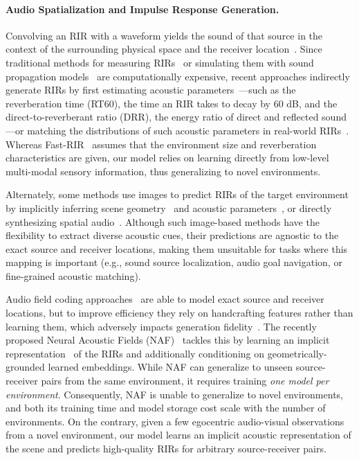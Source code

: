 \paragraph{Audio Spatialization and Impulse Response Generation.} Convolving an RIR with a waveform yields the sound of that source in the context of the surrounding physical space and the receiver location~\citep{10.1109/TASL.2013.2256897, 10.1145/2980179.2982431, Funkhouser03abeam, Savioja2015OverviewOG}. Since traditional methods for measuring RIRs~\citep{Holters2009IMPULSERM, stan2002comparison} or simulating them with sound propagation models~\citep{imageMethod79, chen2020soundspaces, 4117929} are computationally expensive, recent approaches indirectly generate RIRs by first estimating acoustic parameters~\citep{ratnarajah2022fast, 7486010, 8521241, Klein_Neidhardt_Seipel_2019, DBLP:conf/interspeech/MackDH20, 8506462}---such as the reverberation time (RT60), the time an RIR takes to decay by 60 dB, and the direct-to-reverberant ratio (DRR), the energy ratio of direct and reflected sound---or matching the distributions of such acoustic parameters in real-world RIRs~\citep{ratnarajah2020ir}.  Whereas Fast-RIR~\citep{ratnarajah2022fast} assumes that the environment size and reverberation characteristics are given, our model relies on learning directly from low-level multi-modal sensory information, thus generalizing to novel environments.

Alternately, some methods use images to predict RIRs of the target environment~\citep{singh2021image2reverb, kon2019estimation} by implicitly inferring scene geometry~\citep{remaggi2019reproducing} and acoustic parameters~\citep{kon2019estimation}, or directly synthesizing spatial audio~\citep{gao20192, DBLP:journals/corr/abs-2007-09902, Xu_2021_CVPR, Rachavarapu_2021_ICCV,chen2022visual}. Although such image-based methods have the flexibility to extract diverse acoustic cues, their predictions are agnostic to the exact source and receiver locations, making them unsuitable for tasks where this mapping is important (e.g., sound source localization, audio goal navigation, or fine-grained acoustic matching).

Audio field coding approaches~\citep{10.1145/2601097.2601184, 10.1109/TVCG.2014.38, 10.1145/3197517.3201339, 10.1145/3386569.3392459} are able to model exact source and receiver locations, but to improve efficiency they rely on handcrafting features rather than learning them, which adversely impacts generation fidelity~\cite{luo2022learning}. The recently proposed Neural Acoustic Fields (NAF)~\citep{luo2022learning} tackles this by learning an implicit representation~\citep{mildenhall2020nerf, sitzmann2020implicit} of the RIRs and additionally conditioning on geometrically-grounded learned embeddings. While NAF can generalize to unseen source-receiver pairs from the same environment, it requires training \emph{one model per environment}. Consequently, NAF is unable to generalize to novel environments, and both its training time and model storage cost scale with the number of environments. On the contrary, given a few egocentric audio-visual observations from a novel environment, our model learns an implicit acoustic representation of the scene and predicts high-quality RIRs for arbitrary source-receiver pairs. 

